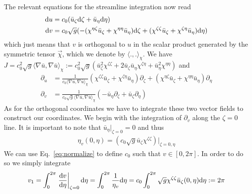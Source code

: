 The relevant equations for the streamline integration now read
\begin{subequations}
\begin{align}
    \mathrm{d} u &= c_0(\bar u_\zeta\mathrm{d} \zeta + \bar u_\eta \mathrm{d} \eta) \\
    \mathrm{d} v &= c_0\sqrt{g}(-(\chi^{\eta\zeta}\bar u_\zeta + \chi^{\eta\eta}\bar u_\eta)\mathrm{d} \zeta + (\chi^{\zeta\zeta}\bar u_\zeta + \chi^{\zeta\eta}\bar u_\eta)\mathrm{d} \eta)
\end{align}
\label{eq:contravariant_monitor}
\end{subequations} 
which just means that $v$
is orthogonal to $u$ in the scalar product 
generated by the symmetric tensor $\vec \chi$, which we denote by $\langle . , .\rangle_\chi$.
We have 
$J=c_0^2 \sqrt{g} \langle \nabla \bar u,\nabla \bar u \rangle_\chi
  := c_0^2\sqrt{g} (\bar u_\zeta^2\chi^{\zeta\zeta} + 2 \bar u_\zeta \bar u_\eta \chi^{\zeta\eta} + \bar u_\eta^2\chi^{\eta\eta})$ 
and 
\begin{subequations}
\begin{align}
  \partial_u &= \frac{1}{c_0\langle\nabla \bar u,\nabla \bar u\rangle_\chi} 
        (\chi^{\zeta\zeta}\bar u_\zeta + \chi^{\zeta\eta}\bar u_\eta)\partial_\zeta + 
        (\chi^{\eta\zeta}\bar u_\zeta + \chi^{\eta\eta}\bar u_\eta)\partial_\eta\label{eq:basis_monitora}\\
  \partial_v &= \frac{1}{c_0\sqrt{g}\langle\nabla \bar u,\nabla \bar u\rangle_\chi} 
          (-\bar u_\eta \partial_\zeta + \bar u_\zeta\partial_\eta)
  \label{eq:basis_monitorb}
\end{align}
\label{eq:basis_monitor}
\end{subequations} 
As for the orthogonal coordinates we have to integrate these two vector fields to construct our coordinates. 
We begin with the integration of $\partial_v$ along the $\zeta=0$ line. 
It is important to note that $\bar u_\eta|_{\zeta=0} = 0$ and thus
\begin{align}
  \eta_v(0, \eta) = \left( c_0\sqrt{g}\bar u_\zeta \chi^{\zeta\zeta} \right)|_{\zeta= 0, \eta}
  \label{eq:normalize}
\end{align}
We can use Eq.~\eqref{eq:normalize} to define $c_0$ such that $v\in[0,2\pi]$. 
In order to do so we simply integrate 
\begin{align}
  v_1 = \int_0^{2\pi} \left .\frac{\mathrm{d} v}{\mathrm{d} \eta}\right|_{\zeta=0} \mathrm{d} \eta = \int_0^{2\pi} \frac{1}{\eta_v}\mathrm{d} \eta = c_0 \int_0^{2\pi} \sqrt{g}\chi^{\zeta\zeta}\bar u_\zeta(0,\eta) \mathrm{d} \eta := 2\pi
  \label{eq:computec0}
\end{align}
